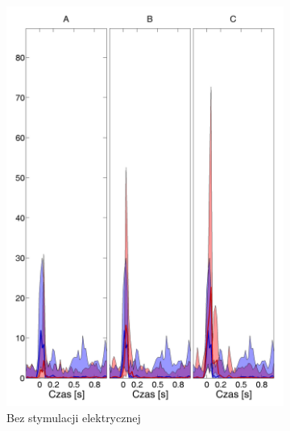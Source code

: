 \documentclass{pracamgr_2}
\begin{document}
	\begin{figure}[h]
		\begin{subfigure}{.5\textwidth}
			\centering
			\includegraphics[width=1.\linewidth]{kontrola15_10-30_z_CxC8_do_SC42.png}
			\caption{Bez stymulacji elektrycznej}
			\label{rys:10_30_kon_CxC_SC}
		\end{subfigure}%
		\begin{subfigure}{.5\textwidth}
			\centering

\end{subfigure}
\end{figure}
\end{document}

